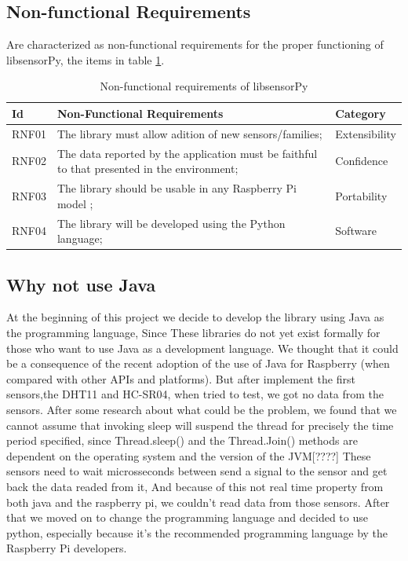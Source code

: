 \documentclass{acm_proc_article-sp}
\begin{document}
\subsection{Non-functional Requirements}
Are characterized as non-functional requirements for the proper functioning of libsensorPy, the items in table \ref{table:rnf}.

\begin{table}[h]
 \caption{Non-functional requirements of libsensorPy}
 \label{table:rnf}
 \begin{tabular}{|l|p{4.7cm}|l|}
 \hline  
 Id & Non-Functional Requirements & Category \\
 \hline  
 RNF01 & The library must allow adition of new sensors/families; & Extensibility\\
 \hline  
 RNF02 & The data reported by the application must be faithful to that presented in the environment; & Confidence \\
 \hline 
 RNF03 & The library should be usable in any Raspberry Pi model ; & Portability \\
 \hline 
 RNF04 & The library will be developed using the Python language; & Software \\
\hline  
\end{tabular}
\end{table}
\subsection{Why not use Java}
At the beginning of this project we decide to develop the library using Java as the programming language, Since These libraries do not yet exist formally for those who want to use Java as a development language. We thought that it could be a consequence of the recent adoption of the use of Java for Raspberry (when compared with other APIs and platforms). But after implement the first sensors,the DHT11 and HC-SR04, when tried to test, we got no data from the sensors.
\newline
\newline
After some research about what could be the problem, we found that we cannot assume that invoking sleep will suspend the thread for precisely the time period specified, since Thread.sleep() and the Thread.Join() methods are dependent on the operating system and the version of the JVM[????]
\newline
\newline
These sensors need to wait microsseconds between send a signal to the sensor and get back the data readed from it, And because of this not real time property from both java and the raspberry pi, we couldn’t read data from those sensors. After that we moved on to change the programming language and decided to use python, especially because it’s the recommended programming language by the Raspberry Pi developers.
\end{document}
